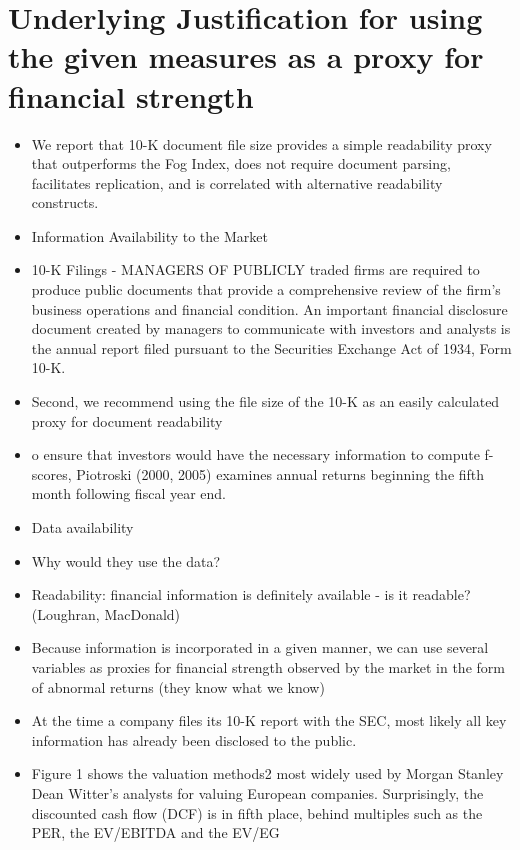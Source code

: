 \documentclass[12pt]{article}
\begin{document}
\section{Underlying Justification for using the given measures as a proxy for financial strength}

    \begin{itemize}
        \item We report that 10-K document file size provides a simple readability proxy that outperforms the Fog Index, does not require document parsing, facilitates replication, and is correlated with alternative readability constructs.\citep{Loughran2014}
        \item Information Availability to the Market
        \item 10-K Filings - MANAGERS OF PUBLICLY traded firms are required to produce public documents
        that provide a comprehensive review of the firm’s business operations and financial condition. An important financial disclosure document created by managers to communicate with investors and analysts is the annual report filed pursuant to the Securities Exchange Act of 1934, Form 10-K.\citep{Loughran2014}
        \item Second, we recommend using the file size of the 10-K as an easily calculated proxy for document readability \citep{Loughran2014}
        \item o ensure that investors would have the necessary information to compute f-scores, Piotroski (2000, 2005) examines annual returns beginning the fifth month following fiscal year end. \citep{Choi2012}
        \item Data availability
        \item Why would they use the data?
        \item Readability: financial information is definitely available - is it readable? (Loughran, MacDonald)
        \item Because information is incorporated in a given manner, we can use several variables as proxies for financial strength observed by the market in the form of abnormal returns (they know what we know)
        \item At the time a company files its 10-K report with the SEC, most likely all key information has already been disclosed to the public.\citep{You2009}
        \item Figure 1 shows the valuation methods2 most widely used by Morgan Stanley Dean Witter’s
        analysts for valuing European companies. Surprisingly, the discounted cash flow (DCF) is in fifth place, behind multiples such as the PER, the EV/EBITDA and the EV/EG \citep{Fernandez2001}
    \end{itemize}
\end{document}
